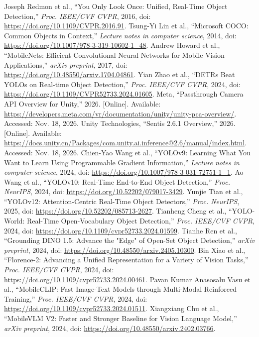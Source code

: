  Joseph Redmon et al., ``You Only Look Once: Unified, Real-Time Object Detection,'' \emph{Proc. IEEE/CVF CVPR}, 2016, doi: \url{https://doi.org/10.1109/CVPR.2016.91}.
 Tsung-Yi Lin et al., ``Microsoft COCO: Common Objects in Context,'' \emph{Lecture notes in computer science}, 2014, doi: \url{https://doi.org/10.1007/978-3-319-10602-1_48}.
 Andrew Howard et al., ``MobileNets: Efficient Convolutional Neural Networks for Mobile Vision Applications,'' \emph{arXiv preprint}, 2017, doi: \url{https://doi.org/10.48550/arxiv.1704.04861}.
 Yian Zhao et al., ``DETRs Beat YOLOs on Real-time Object Detection,'' \emph{Proc. IEEE/CVF CVPR}, 2024, doi: \url{https://doi.org/10.1109/CVPR52733.2024.01605}.
 Meta, ``Passthrough Camera API Overview for Unity,'' 2026. [Online]. Available: \url{https://developers.meta.com/vr/documentation/unity/unity-pca-overview/}. Accessed: Nov. 18, 2026.
 Unity Technologies, ``Sentis 2.6.1 Overview,'' 2026. [Online]. Available: \url{https://docs.unity.cn/Packages/com.unity.ai.inference@2.6/manual/index.html}. Accessed: Nov. 18, 2026.
 Chien-Yao Wang et al., ``YOLOv9: Learning What You Want to Learn Using Programmable Gradient Information,'' \emph{Lecture notes in computer science}, 2024, doi: \url{https://doi.org/10.1007/978-3-031-72751-1_1}.
 Ao Wang et al., ``YOLOv10: Real-Time End-to-End Object Detection,'' \emph{Proc. NeurIPS}, 2024, doi: \url{https://doi.org/10.52202/079017-3429}.
 Yunjie Tian et al., ``YOLOv12: Attention-Centric Real-Time Object Detectors,'' \emph{Proc. NeurIPS}, 2025, doi: \url{https://doi.org/10.52202/085713-2627}.
 Tianheng Cheng et al., ``YOLO-World: Real-Time Open-Vocabulary Object Detection,'' \emph{Proc. IEEE/CVF CVPR}, 2024, doi: \url{https://doi.org/10.1109/cvpr52733.2024.01599}.
 Tianhe Ren et al., ``Grounding DINO 1.5: Advance the "Edge" of Open-Set Object Detection,'' \emph{arXiv preprint}, 2024, doi: \url{https://doi.org/10.48550/arxiv.2405.10300}.
 Bin Xiao et al., ``Florence-2: Advancing a Unified Representation for a Variety of Vision Tasks,'' \emph{Proc. IEEE/CVF CVPR}, 2024, doi: \url{https://doi.org/10.1109/cvpr52733.2024.00461}.
 Pavan Kumar Anasosalu Vasu et al., ``MobileCLIP: Fast Image-Text Models through Multi-Modal Reinforced Training,'' \emph{Proc. IEEE/CVF CVPR}, 2024, doi: \url{https://doi.org/10.1109/cvpr52733.2024.01511}.
 Xiangxiang Chu et al., ``MobileVLM V2: Faster and Stronger Baseline for Vision Language Model,'' \emph{arXiv preprint}, 2024, doi: \url{https://doi.org/10.48550/arxiv.2402.03766}.
